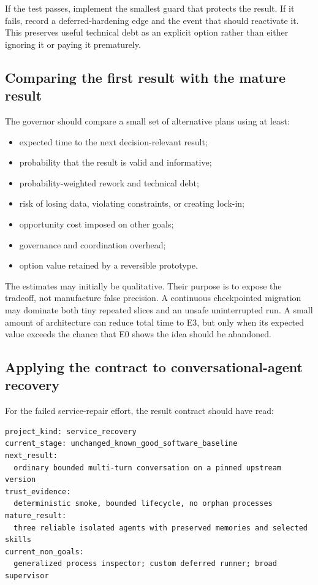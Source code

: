 \documentclass[11pt,letterpaper]{article}
\begin{document}
If the test passes, implement the smallest guard that protects the result. If
it fails, record a deferred-hardening edge and the event that should reactivate
it. This preserves useful technical debt as an explicit option rather than
either ignoring it or paying it prematurely.

\subsection{Comparing the first result with the mature result}

The governor should compare a small set of alternative plans using at least:

\begin{itemize}
  \item expected time to the next decision-relevant result;
  \item probability that the result is valid and informative;
  \item probability-weighted rework and technical debt;
  \item risk of losing data, violating constraints, or creating lock-in;
  \item opportunity cost imposed on other goals;
  \item governance and coordination overhead;
  \item option value retained by a reversible prototype.
\end{itemize}

The estimates may initially be qualitative. Their purpose is to expose the
tradeoff, not manufacture false precision. A continuous checkpointed migration
may dominate both tiny repeated slices and an unsafe uninterrupted run. A
small amount of architecture can reduce total time to E3, but only when its
expected value exceeds the chance that E0 shows the idea should be abandoned.

\subsection{Applying the contract to conversational-agent recovery}

For the failed service-repair effort, the result contract should have read:

\begin{lstlisting}[style=plain]
project_kind: service_recovery
current_stage: unchanged_known_good_software_baseline
next_result:
  ordinary bounded multi-turn conversation on a pinned upstream version
trust_evidence:
  deterministic smoke, bounded lifecycle, no orphan processes
mature_result:
  three reliable isolated agents with preserved memories and selected skills
current_non_goals:
  generalized process inspector; custom deferred runner; broad supervisor
\end{lstlisting}
\end{document}
